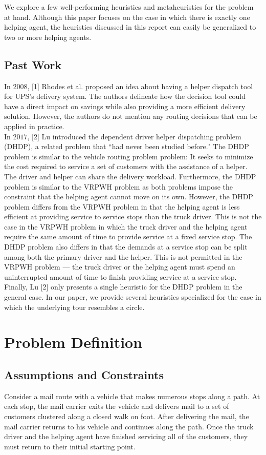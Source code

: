 \documentclass[12pt]{scrartcl}
\begin{document}
We explore a few well-performing heuristics and metaheuristics for the problem at hand. Although this paper focuses on the case in which there is exactly one helping agent, the heuristics discussed in this report can easily be generalized to two or more helping agents.

\subsection{Past Work}
In $2008$, [1] Rhodes et al. proposed an idea about having a helper dispatch tool for UPS's delivery system. The authors delineate how the decision tool could have a direct impact on savings while also providing a more efficient delivery solution. However, the authors do not mention any routing decisions that can be applied in practice.  \\

In $2017$, [2] Lu introduced the dependent driver helper dispatching problem (DHDP), a related problem that ``had never been studied before." The DHDP problem is similar to the vehicle routing problem problem: It seeks to minimize the cost required to service a set of customers with the assistance of a helper. The driver and helper can share the delivery workload. Furthermore, the DHDP problem is similar to the VRPWH problem as both problems impose the constraint that the helping agent cannot move on its own. However, the DHDP problem differs from the VRPWH problem in that the helping agent is less efficient at providing service to service stops than the truck driver. This is not the case in the VRPWH problem in which the truck driver and the helping agent require the same amount of time to provide service at a fixed service stop. The DHDP problem also differs in that the demands at a service stop can be split among both the primary driver and the helper. This is not permitted in the VRPWH problem --- the truck driver or the helping agent must spend an uninterrupted amount of time to finish providing service at a service stop. Finally, Lu [2] only presents a single heuristic for the DHDP problem in the general case. In our paper, we provide several heuristics specialized for the case in which the underlying tour resembles a circle.


\section{Problem Definition}
\subsection{Assumptions and Constraints}
Consider a mail route with a vehicle that makes numerous stops along a path. At each stop, the mail carrier exits the vehicle and delivers mail to a set of customers clustered along a closed walk on foot. After delivering the mail, the mail carrier returns to his vehicle and continues along the path. Once the truck driver and the helping agent have finished servicing all of the customers, they must return to their initial starting point. \\ %
\end{document}
